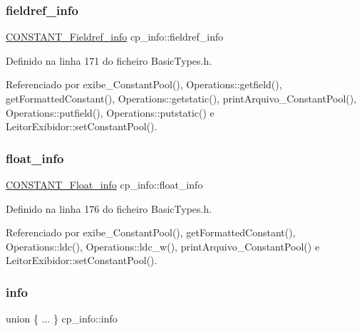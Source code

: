 \mbox{\label{structcp__info_a12c0c04a72137ea73d22a3d652de1774}} 
\subsubsection{\texorpdfstring{fieldref\+\_\+info}{fieldref\_info}}
{\footnotesize\ttfamily \hyperlink{structCONSTANT__Fieldref__info}{C\+O\+N\+S\+T\+A\+N\+T\+\_\+\+Fieldref\+\_\+info} cp\+\_\+info\+::fieldref\+\_\+info}



Definido na linha 171 do ficheiro Basic\+Types.\+h.



Referenciado por exibe\+\_\+\+Constant\+Pool(), Operations\+::getfield(), get\+Formatted\+Constant(), Operations\+::getstatic(), print\+Arquivo\+\_\+\+Constant\+Pool(), Operations\+::putfield(), Operations\+::putstatic() e Leitor\+Exibidor\+::set\+Constant\+Pool().

\mbox{\label{structcp__info_a367569f3e0a70a50afc482c4ac2aece1}} 
\subsubsection{\texorpdfstring{float\+\_\+info}{float\_info}}
{\footnotesize\ttfamily \hyperlink{structCONSTANT__Float__info}{C\+O\+N\+S\+T\+A\+N\+T\+\_\+\+Float\+\_\+info} cp\+\_\+info\+::float\+\_\+info}



Definido na linha 176 do ficheiro Basic\+Types.\+h.



Referenciado por exibe\+\_\+\+Constant\+Pool(), get\+Formatted\+Constant(), Operations\+::ldc(), Operations\+::ldc\+\_\+w(), print\+Arquivo\+\_\+\+Constant\+Pool() e Leitor\+Exibidor\+::set\+Constant\+Pool().

\mbox{\label{structcp__info_a8aca171d81e9715b113c7919e8c16dce}} 
\subsubsection{\texorpdfstring{info}{info}}
{\footnotesize\ttfamily union \{ ... \}   cp\+\_\+info\+::info}



